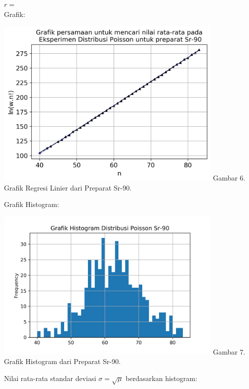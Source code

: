 \documentclass{article}
\begin{document}
			$r = $ \\
			Grafik: 
			\begin{center}
				\includegraphics[width=110mm]{Data/Sr-90-Graph.png}
				Gambar 6. Grafik Regresi Linier dari Preparat Sr-90.
			\end{center}
			Grafik Histogram:
			\begin{center}
				\includegraphics[width=110mm]{Data/Sr-90.png}
				Gambar 7. Grafik Histogram dari Preparat Sr-90.
			\end{center} 
			Nilai rata-rata standar deviasi $\sigma = \sqrt{\mu}$ berdasarkan histogram:\\
				
\end{document}
